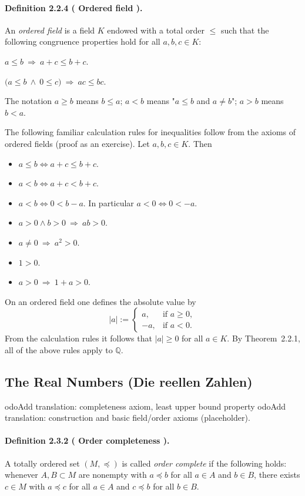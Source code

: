 \documentclass[12pt,a4paper]{article}
\newcommand{\Q}{\mathbb{Q}}
\newcommand{\NumberedDefinition}[3]{%
\paragraph*{Definition #1 ( #2 ).} #3\par}
\theoremstyle{plain}
\theoremstyle{definition}
\theoremstyle{remark}
\begin{document}
\NumberedDefinition{2.2.4}{Ordered field}{An \emph{ordered field} is a field $K$ endowed with a total order $\le$ such that the following congruence properties hold for all $a,b,c\in K$:
\begin{description}[leftmargin=*]
	\item[O1)] $a\le b \ \Longrightarrow\ a+c \le b+c$.
	\item[O2)] $\big( a\le b \ \wedge\ 0\le c\big) \ \Longrightarrow\ ac \le bc$.
\end{description}}

The notation $a\ge b$ means $b\le a$; $a<b$ means "$a\le b$ and $a\ne b$"; $a>b$ means $b<a$.

The following familiar calculation rules for inequalities follow from the axioms of ordered fields (proof as an exercise). Let $a,b,c\in K$. Then
\begin{itemize}[leftmargin=*]
	\item $a\le b \iff a+c\le b+c$.
	\item $a<b \iff a+c<b+c$.
	\item $a<b \iff 0<b-a$. In particular $a<0 \iff 0<-a$.
	\item $a>0 \wedge b>0 \ \Rightarrow\ ab>0$.
	\item $a\ne0 \ \Rightarrow\ a^2>0$.
	\item $1>0$.
	\item $a>0 \ \Rightarrow\ 1+a>0$.
\end{itemize}

On an ordered field one defines the absolute value by
\[
	|a| := \begin{cases}
		a,& \text{if } a\ge 0,\\
		-a,& \text{if } a<0.
	\end{cases}
\]
From the calculation rules it follows that $|a|\ge 0$ for all $a\in K$.
By Theorem~2.2.1, all of the above rules apply to $\Q$.

\subsection{The Real Numbers (Die reellen Zahlen)}
	odo{Add translation: completeness axiom, least upper bound property}
\label{subsec:reals}
	odo{Add translation: construction and basic field/order axioms (placeholder).}

\NumberedDefinition{2.3.2}{Order completeness}{A totally ordered set $(M,\preceq)$ is called \emph{order complete} if the following holds: whenever $A,B\subset M$ are nonempty with $a\preceq b$ for all $a\in A$ and $b\in B$, there exists $c\in M$ with $a\preceq c$ for all $a\in A$ and $c\preceq b$ for all $b\in B$.}
\end{document}
